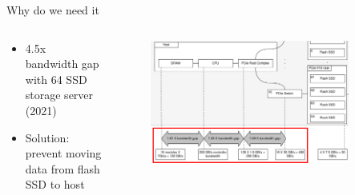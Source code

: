 \documentclass[aspectratio=169, notes]{beamer}
\begin{document}
\begin{frame}{Why do we need it}
    \begin{columns}
        \begin{column}{0.3\textwidth}
            \footnotesize
            \begin{itemize}
                \item 4.5x bandwidth gap with 64 SSD storage server (2021)
                \item Solution: prevent moving data from flash SSD to host
            \end{itemize}
        \end{column}
        \begin{column}{0.7\textwidth}
            \begingroup
            \small
            \begin{figure}
                \centering
                \includegraphics[width=0.87\textwidth]{resources/images/storage-bottleneck2.png}
            \end{figure}
            \endgroup
        \end{column}
    \end{columns}
\end{frame}
\end{document}
